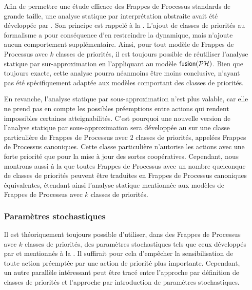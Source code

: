 Afin de permettre une étude efficace des Frappes de Processus standards de grande taille,
une analyse statique par interprétation abstraite avait été développée
par .
Son principe est rappelé à la .
L'ajout de classes de priorités au formalisme a pour conséquence d'en restreindre la dynamique,
mais n'ajoute aucun comportement supplémentaire.
Ainsi, pour tout modèle de Frappes de Processus avec $k$ classes de priorités,
il est toujours possible de réutiliser l'analyse statique par sur-approximation
en l'appliquant au modèle $\mathsf{fusion}(\mathcal{PH})$.
Bien que toujours exacte, cette analyse pourra néanmoins être moins conclusive,
n'ayant pas été spécifiquement adaptée aux modèles comportant des classes de priorités.

En revanche, l'analyse statique par sous-approximation n'est plus valable,
car elle ne prend pas en compte les possibles préemptions entre actions qui rendent
impossibles certaines atteignabilités.
C'est pourquoi une nouvelle version de l'analyse statique par sous-approximation sera développée
au 
sur une classe particulière de Frappes de Processus avec 2 classes de priorités, appelées
Frappes de Processus canoniques.
Cette classe particulière n'autorise les actions avec une forte priorité que pour la mise à jour
des sortes coopératives.
Cependant, nous montrons aussi à la 
que toutes Frappes de Processus avec un nombre quelconque de classes de priorités
peuvent être traduites en Frappes de Processus canoniques équivalentes,
étendant ainsi l'analyse statique mentionnée aux modèles de Frappes de Processus
avec $k$ classes de priorités.

\subsubsection{Paramètres stochastiques}

Il est théoriquement toujours possible d'utiliser,
dans des Frappes de Processus avec $k$ classes de priorités,
des paramètres stochastiques tels que ceux
développés par  et mentionnés à la .
Il suffirait pour cela d'empêcher la sensibilisation de toute action préemptée par une action
de priorité plus importante.
Cependant, un autre parallèle intéressant peut être tracé entre l'approche
par définition de classes de priorités
et l'approche par introduction de paramètres stochastiques.

